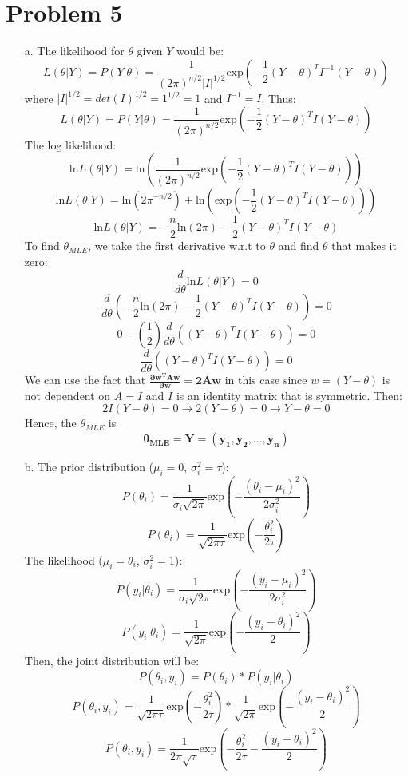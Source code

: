 \documentclass[twoside]{homework}
\begin{document}
\section*{Problem 5}
\begin{itemize}
    \item [a.] The likelihood for $\theta$ given $Y$ would be:
    $$L(\theta|Y)=P(Y|\theta)=\frac{1}{(2\pi)^{n/2}|I|^{1/2}}\text{exp}(-\frac{1}{2}(Y-\theta)^TI^{-1}(Y-\theta))$$
    where $|I|^{1/2}=det(I)^{1/2}=1^{1/2}=1$ and $I^{-1}=I$. Thus:
    $$L(\theta|Y)=P(Y|\theta)=\frac{1}{(2\pi)^{n/2}}\text{exp}(-\frac{1}{2}(Y-\theta)^TI(Y-\theta))$$
    The log likelihood:
    $$\text{ln}L(\theta|Y)=\text{ln}(\frac{1}{(2\pi)^{n/2}}\text{exp}(-\frac{1}{2}(Y-\theta)^TI(Y-\theta)))$$
    $$\text{ln}L(\theta|Y)=\text{ln}({2\pi}^{-n/2})+\text{ln}(\text{exp}(-\frac{1}{2}(Y-\theta)^TI(Y-\theta)))$$
    $$\text{ln}L(\theta|Y)=-\frac{n}{2}\text{ln}(2\pi)-\frac{1}{2}(Y-\theta)^TI(Y-\theta)$$
    To find $\theta_{MLE}$, we take the first derivative w.r.t to $\theta$ and find $\theta$ that makes it zero:
    $$\frac{d}{d\theta}\text{ln}L(\theta|Y)=0$$
    $$\frac{d}{d\theta}(-\frac{n}{2}\text{ln}(2\pi)-\frac{1}{2}(Y-\theta)^TI(Y-\theta))=0$$
    $$0-(\frac{1}{2})\frac{d}{d\theta}((Y-\theta)^TI(Y-\theta))=0$$
    $$\frac{d}{d\theta}((Y-\theta)^TI(Y-\theta))=0$$
    We can use the fact that $\mathbf{ \frac{\partial w^T A w}{\partial w} = 2Aw}$ in this case since $w=(Y-\theta)$ is not dependent on $A=I$ and $I$ is an identity matrix that is symmetric. Then:
    $$2I(Y-\theta)=0 \xrightarrow{} 2(Y-\theta)=0 \xrightarrow{} Y-\theta=0$$
    Hence, the $\theta_{MLE}$ is
    $$\boldsymbol{\theta_{MLE}=Y=(y_1, y_2, ..., y_n)}$$
    \item [b.] The prior distribution ($\mu_i=0$, $\sigma^2_i=\tau$):
    $$P(\theta_i)=\frac{1}{\sigma_i\sqrt{2\pi}}\text{exp}(-\frac{(\theta_i-\mu_i)^2}{2\sigma_i^2})$$
    $$P(\theta_i)=\frac{1}{\sqrt{2\pi\tau}}\text{exp}(-\frac{\theta_i^2}{2\tau})$$
    The likelihood ($\mu_i=\theta_i$, $\sigma_i^2=1$):
    $$P(y_i|\theta_i)=\frac{1}{\sigma_i\sqrt{2\pi}}\text{exp}(-\frac{(y_i-\mu_i)^2}{2\sigma_i^2})$$
    $$P(y_i|\theta_i)=\frac{1}{\sqrt{2\pi}}\text{exp}(-\frac{(y_i-\theta_i)^2}{2})$$
    Then, the joint distribution will be:
    $$P(\theta_i,y_i)={}P(\theta_i)*P(y_i|\theta_i)$$
    $$P(\theta_i,y_i)={}\frac{1}{\sqrt{2\pi\tau}}\text{exp}(-\frac{\theta_i^2}{2\tau})*\frac{1}{\sqrt{2\pi}}\text{exp}(-\frac{(y_i-\theta_i)^2}{2})$$
    $$P(\theta_i,y_i)={}\frac{1}{2\pi\sqrt{\tau}}\text{exp}(-\frac{\theta_i^2}{2\tau}-\frac{(y_i-\theta_i)^2}{2})$$

\end{itemize}
\end{document}
